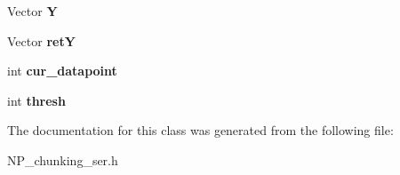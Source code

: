\begin{DoxyCompactItemize}
\item 
\hypertarget{classFeatureset_af44e4e63f643f4f6fef74d2b0c231fe4}{
Vector {\bfseries Y}}
\label{classFeatureset_af44e4e63f643f4f6fef74d2b0c231fe4}

\item 
\hypertarget{classFeatureset_a13d5de2be2a010568eef685bfcf4effa}{
Vector {\bfseries retY}}
\label{classFeatureset_a13d5de2be2a010568eef685bfcf4effa}

\item 
\hypertarget{classFeatureset_ae9d12c483dfbb8c98e7d66be2fd7a73e}{
int {\bfseries cur\_\-datapoint}}
\label{classFeatureset_ae9d12c483dfbb8c98e7d66be2fd7a73e}

\item 
\hypertarget{classFeatureset_a7790a50a0a8ea3c7c66fcd92d8ff5813}{
int {\bfseries thresh}}
\label{classFeatureset_a7790a50a0a8ea3c7c66fcd92d8ff5813}

\end{DoxyCompactItemize}


The documentation for this class was generated from the following file:\begin{DoxyCompactItemize}
\item 
NP\_\-chunking\_\-ser.h\end{DoxyCompactItemize}
